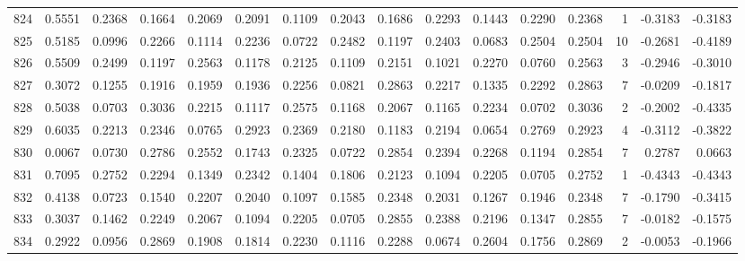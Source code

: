 \begin{tabular}{lrrrrrrrrrrrrrrr}
824 &      0.5551 &  0.2368 &  0.1664 &  0.2069 &  0.2091 &  0.1109 &  0.2043 &  0.1686 &  0.2293 &  0.1443 &   0.2290 &     0.2368 &      1 &                   -0.3183 &                    -0.3183 \\
825 &      0.5185 &  0.0996 &  0.2266 &  0.1114 &  0.2236 &  0.0722 &  0.2482 &  0.1197 &  0.2403 &  0.0683 &   0.2504 &     0.2504 &     10 &                   -0.2681 &                    -0.4189 \\
826 &      0.5509 &  0.2499 &  0.1197 &  0.2563 &  0.1178 &  0.2125 &  0.1109 &  0.2151 &  0.1021 &  0.2270 &   0.0760 &     0.2563 &      3 &                   -0.2946 &                    -0.3010 \\
827 &      0.3072 &  0.1255 &  0.1916 &  0.1959 &  0.1936 &  0.2256 &  0.0821 &  0.2863 &  0.2217 &  0.1335 &   0.2292 &     0.2863 &      7 &                   -0.0209 &                    -0.1817 \\
828 &      0.5038 &  0.0703 &  0.3036 &  0.2215 &  0.1117 &  0.2575 &  0.1168 &  0.2067 &  0.1165 &  0.2234 &   0.0702 &     0.3036 &      2 &                   -0.2002 &                    -0.4335 \\
829 &      0.6035 &  0.2213 &  0.2346 &  0.0765 &  0.2923 &  0.2369 &  0.2180 &  0.1183 &  0.2194 &  0.0654 &   0.2769 &     0.2923 &      4 &                   -0.3112 &                    -0.3822 \\
830 &      0.0067 &  0.0730 &  0.2786 &  0.2552 &  0.1743 &  0.2325 &  0.0722 &  0.2854 &  0.2394 &  0.2268 &   0.1194 &     0.2854 &      7 &                    0.2787 &                     0.0663 \\
831 &      0.7095 &  0.2752 &  0.2294 &  0.1349 &  0.2342 &  0.1404 &  0.1806 &  0.2123 &  0.1094 &  0.2205 &   0.0705 &     0.2752 &      1 &                   -0.4343 &                    -0.4343 \\
832 &      0.4138 &  0.0723 &  0.1540 &  0.2207 &  0.2040 &  0.1097 &  0.1585 &  0.2348 &  0.2031 &  0.1267 &   0.1946 &     0.2348 &      7 &                   -0.1790 &                    -0.3415 \\
833 &      0.3037 &  0.1462 &  0.2249 &  0.2067 &  0.1094 &  0.2205 &  0.0705 &  0.2855 &  0.2388 &  0.2196 &   0.1347 &     0.2855 &      7 &                   -0.0182 &                    -0.1575 \\
834 &      0.2922 &  0.0956 &  0.2869 &  0.1908 &  0.1814 &  0.2230 &  0.1116 &  0.2288 &  0.0674 &  0.2604 &   0.1756 &     0.2869 &      2 &                   -0.0053 &                    -0.1966 \\

\end{tabular}
